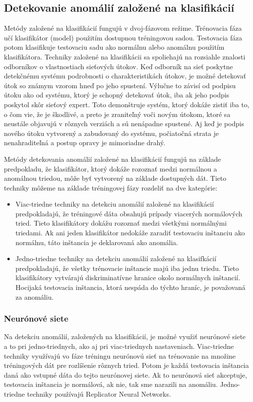 \subsection{Detekovanie anomálií založené na klasifikácií}
Metódy založené na klasifikácií fungujú v dvoj-fázovom režime. Trénovacia fáza učí klasifikátor (model) použitím dostupnou tréningovou sadou. Testovacia fáza potom klasifikuje testovaciu sadu ako normálnu alebo anomálnu použitím klasifikátora.\cite{Chandola} Techniky založené na klasifikácii sa spoliehajú na rozsiahle znalosti odborníkov o vlastnostiach sieťových útokov. Keď odborník na sieť poskytne detekčnému systému podrobnosti o charakteristikách útokov, je možné detekovať útok so známym vzorom hneď po jeho spustení. Výlučne to závisí od podpisu útoku ako od systému, ktorý je schopný detekovať útok, iba ak jeho podpis poskytol skôr sieťový expert. Toto demonštruje systém, ktorý dokáže zistiť iba to, o čom vie, že je škodlivé, a preto je  zraniteľný voči novým útokom, ktoré sa neustále objavujú v rôznych verziách a sú nenápadne spustené. Aj keď je podpis nového útoku vytvorený a zabudovaný do systému, počiatočná strata je nenahraditeľná a postup opravy je mimoriadne drahý.\cite{ahmed}\par

Metódy detekovania anomálií založené na klasifikácií fungujú na základe predpokladu, že klasifikátor, ktorý dokáže rozoznať medzi normálnou a anomálnou triedou, môže byť vytvorený na základe dostupných dát. Tieto techniky môžeme na základe tréningovej fázy rozdeliť  na dve kategórie:
\begin{itemize}
    \item Viac-triedne techniky na detekciu anomálií založené na klasifikácií predpokladajú, že tréningové dáta obsahujú prípady viacerých normálových tried. Tieto klasifikátory dokážu rozoznať medzi všetkými normálnými triedami. Ak ani jeden klasifikátor nedokáže zaradiť testovaciu inštanciu ako normálnu, táto inštancia je deklarovaná ako anomália.
    \item Jedno-triedne techniky na detekciu anomálií založené na klasifkácií predpokladajú, že všetky trénovacie inštancie majú iba jednu triedu. Tieto klasifikátory vytvárajú diskriminatívne hranice okolo normálnych inštancií. Hocijaká testovacia inštancia, ktorá nespáda do týchto hraníc, je považovaná za anomáliu.
\end{itemize}
\subsubsection{Neurónové siete}
Na detekciu anomálií, založených na klasifikácií, je možné využiť neurónové siete a to pri jedno-triednych,  ako aj pri viac-triednych nastaveniach. Viac-triedne techniky využívajú vo fáze tréningu neurónovú sieť na trénovanie na množine tréningových dát pre rozlíšenie rôznych tried. Potom je každá testovacia inštancia daná ako vstupné dáta do tejto neurónovej siete. Ak to neurónová sieť akceptuje, testovacia inštancia je normálová, ak nie, tak sme narazili na anomáliu. Jedno-triedne techniky používajú Replicator Neural Networks.\cite{Chandola}
